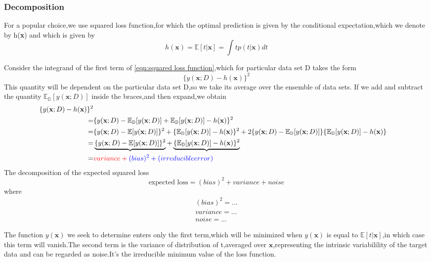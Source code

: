 \subsubsection{Decomposition}
For a popular choice,we use squared loss function,for which the optimal prediction is given by the conditional
expectation,which we denote by h(\textbf{x}) and which is given by 
\begin{equation}
h(\textbf{x}) = \mathbb{E}[t|\textbf{x}] = \int tp(t|\textbf{x})dt
\end{equation}

Consider the integrand of the first term of \ref{eqn:squared loss function},which for particular data set D takes the form
\begin{equation}
\{ y(\textbf{x};D) - h(\textbf{x}) \} ^2
\end{equation}
This quantity will be dependent on the particular data set D,so we take its average over the ensemble of data sets.
If we add and subtract the quantity $ \mathbb{E_D}[y(\textbf{x};D)] $ inside the braces,and then expand,we obtain
\begin{align}
\{ y(\textbf{x};D) - h(\textbf{x}) \} ^2 \\
=&\{y(\textbf{x};D) - \mathbb{E_D}[y(\textbf{x};D)] 
	+ \mathbb{E_D}[y(\textbf{x};D)] -h(\textbf{x})  \}^2         \\
=& \{ y(\textbf{x};D) -\mathbb{E}[y(\textbf{x};D)]    \}^2 
	+ \{ \mathbb{E_D}[y(\textbf{x};D)] - h(\textbf{x})\}^2
	+ 2\{ y(\textbf{x};D) - \mathbb{E_D}[y(\textbf{x};D)]\}\{ \mathbb{E_D}[y(\textbf{x};D)] -h(\textbf{x})\} \\
=& \underbrace{\{ y(\textbf{x};D) -\mathbb{E}[y(\textbf{x};D)]    \}^2} 
	+ \underbrace{\{ \mathbb{E_D}[y(\textbf{x};D)] - h(\textbf{x})\}^2}   \\
=&                    \color{red}{variance}                 +   \color{blue}{(bias)^2}  + (irreducible error)
\end{align}
The decomposition of the expected squared loss
\begin{equation}
\text{expected loss} = (bias)^2 + variance + noise
\end{equation}
where
\begin{eqnarray}
(bias)^2 = ... \\
variance = ... \\
noise = ...
\end{eqnarray}

The function $ y(\textbf{x}) $ we seek to determine enters only the first term,which will be minimized when $ y(\textbf{x}) $ is equal to $ \mathbb{E}[t|\textbf{x}] $,in which case this term will vanish.The second term is the variance of distribution of t,averaged over $ \textbf{x} $,representing the intrinsic variabilility of the target data and can be regarded as noise.It's the irreducible minimum value of the loss function.


